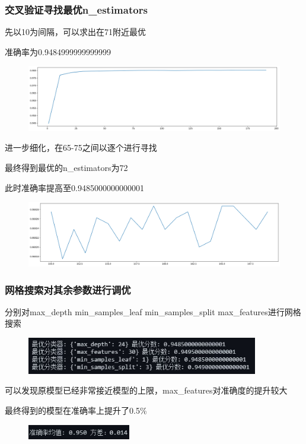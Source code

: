 \documentclass[aspectratio=43, 12pt, utf8, mathserif]{ctexbeamer} %
\begin{document}
\begin{frame}
    \frametitle{交叉验证寻找最优n\_estimators}
    先以10为间隔，可以求出在71附近最优
    
    准确率为0.9484999999999999
    \begin{figure}[h]
        \centering
        \includegraphics[width=\textwidth]{image/n_estimators.png}
    \end{figure}
\end{frame}

\begin{frame}
    进一步细化，在65-75之间以逐个进行寻找
    
    最终得到最优的n\_estimators为72
    
    此时准确率提高至0.9485000000000001
    \begin{figure}[h]
        \centering
        \includegraphics[height=0.5\textheight]{image/n_estimators_final.png}
    \end{figure}
\end{frame}

\begin{frame}
    \frametitle{网格搜索对其余参数进行调优}
    分别对max\_depth min\_samples\_leaf min\_samples\_split max\_features进行网格搜索
    \begin{figure}[h]
        \centering
        \includegraphics[width=0.9\textwidth]{image/1.jpg}
    \end{figure}
    可以发现原模型已经非常接近模型的上限，max\_features对准确度的提升较大

    最终得到的模型在准确率上提升了0.5\%
    \begin{figure}[h]
        \centering
        \includegraphics[width=0.4\textwidth]{image/rfc_after_adjust.jpg}
    \end{figure}
\end{frame}
\end{document}
